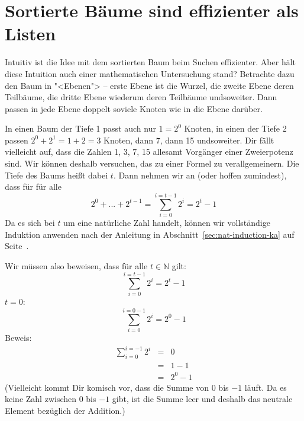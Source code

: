 
\section{Sortierte Bäume sind effizienter als Listen}
  
Intuitiv ist die Idee mit dem sortierten Baum beim Suchen
effizienter.  Aber hält diese Intuition auch einer mathematischen
Untersuchung stand?  Betrachte dazu den Baum in "<Ebenen"> --
erste Ebene ist die Wurzel, die zweite Ebene deren Teilbäume, die
dritte Ebene wiederum deren Teilbäume undsoweiter.  Dann passen in
jede Ebene doppelt soviele Knoten wie in die Ebene darüber.

In einen Baum der Tiefe 1 passt auch nur $1 = 2^0$ Knoten, in einen
der Tiefe 2 passen $2^0 + 2^1 = 1+2 = 3$ Knoten, dann 7, dann 15
undsoweiter.  Dir fällt vielleicht auf, dass die Zahlen 1, 3, 7, 15
allesamt Vorgänger einer Zweierpotenz sind.  Wir können deshalb
versuchen, das zu einer Formel zu verallgemeinern.  Die Tiefe des
Baums heißt dabei $t$.  Dann nehmen wir an (oder hoffen zumindest),
dass für für alle 
%
\begin{displaymath}
  2^0 + ... + 2^{t-1} = \sum_{i=0}^{i=t-1} 2^i  = 2^t-1
\end{displaymath}
%
Da es sich bei $t$ um eine natürliche Zahl handelt, können wir
vollständige Induktion anwenden nach der Anleitung in
Abschnitt~\ref{sec:nat-induction-ka} auf
Seite~\pageref{sec:nat-induction-ka}.

Wir müssen also beweisen, dass für alle $t\in\mathbb{N}$ gilt:
%
\begin{displaymath}
  \sum_{i=0}^{i=t-1} 2^i  = 2^t-1
\end{displaymath}
%
$t=0$:
%
\begin{displaymath}
  \sum_{i=0}^{i=0-1} 2^i = 2^0 - 1
\end{displaymath}
%
Beweis:
%
\begin{eqnarray*}
  \sum_{i=0}^{i=-1} 2^i
  &=& 0\\
  &=& 1-1\\
  &=& 2^0 - 1
\end{eqnarray*}
%
(Vielleicht kommt Dir komisch vor, dass die Summe von $0$ bis $-1$
läuft.  Da es keine Zahl zwischen $0$ bis $-1$ gibt, ist die Summe
leer und deshalb das neutrale Element bezüglich der Addition.)

\smallskip

